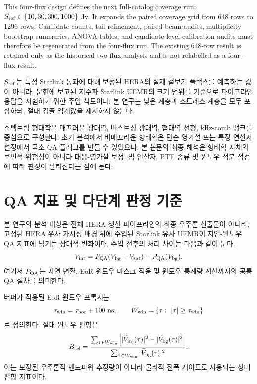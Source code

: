 \documentclass[final,5p,times]{elsarticle}
\begin{document}
This four-flux design defines the next full-catalog coverage run:
$S_{\rm ref}\in\{10,30,300,1000\}$ Jy. It expands the paired coverage grid
from 648 rows to 1296 rows. Candidate counts, tail refinement, paired-beam
audits, multiplicity bootstrap summaries, ANOVA tables, and candidate-level
calibration audits must therefore be regenerated from the four-flux run. The
existing 648-row result is retained only as the historical two-flux analysis
and is not relabelled as a four-flux result.

$S_{\rm ref}$는 특정 Starlink 통과에 대해 보정된 HERA의 실제 겉보기 플럭스를 예측하는 값이 아니라,
문헌에 보고된 저주파 Starlink UEMR의 크기 범위를 기준으로 파이프라인 응답을 시험하기 위한 주입
척도이다. 본 연구는 낮은 계층과 스트레스 계층을 모두 포함하되, 절대 검출 임계값을 제시하지 않는다.

스펙트럼 형태학은 매끄러운 광대역, 버스트성 광대역, 협대역 선형, kHz-comb 뱅크를 중심으로
구성한다. 초기 분석에서 비매끄러운 형태학은 단순 영가설 또는 특정 연산자 설정에서
국소 QA 플래그를 만들 수 있었으나, 본 논문의 최종 해석은 형태학 자체의 보편적 위험성이 아니라
대응-영가설 보정, 빔 연산자, PTE 종류 및 윈도우 적분 점검에 따라 판정이 달라진다는
점에 둔다.

\section{QA 지표 및 다단계 판정 기준}
\label{sec:metrics}

본 연구의 분석 대상은 전체 HERA 생산 파이프라인의 최종 우주론 산출물이 아니라, 고정된 HERA 유사
가시성 배경 위에 주입된 Starlink 유사 UEMR이 지연-윈도우 QA 지표에 남기는 상대적 변화이다.
주입 전후의 처리 차이는 다음과 같이 둔다.
\begin{equation}
  V_{\rm int}
  =
  P_{\rm QA}(V_{\rm bg}+V_{\rm sat})
  -
  P_{\rm QA}(V_{\rm bg}).
\end{equation}
여기서 $P_{\rm QA}$는 지연 변환, EoR 윈도우 마스크 적용 및 윈도우 통계량 계산까지의 공통 QA 절차를
의미한다.

버퍼가 적용된 EoR 윈도우 프록시는
\begin{equation}
  \tau_{\rm win}=\tau_{\rm hor}+100~{\rm ns}, \qquad
  W_{\rm win}=\{\tau:\ |\tau|\ge \tau_{\rm win}\}
\end{equation}
로 정의한다. 절대 윈도우 편향은
\begin{equation}
  B_{\rm rel}
  =
  \frac{
  \sum_{\tau\in W_{\rm win}}
  \left|
  |\widetilde{V}_{\rm inj}(\tau)|^2-
  |\widetilde{V}_{\rm bg}(\tau)|^2
  \right|
  }{
  \sum_{\tau\in W_{\rm win}}
  |\widetilde{V}_{\rm bg}(\tau)|^2
  }.
\end{equation}
이는 보정된 우주론적 밴드파워 추정량이 아니라 물리적 진폭 게이트로 사용되는 상대 편향 지표이다.
\end{document}
